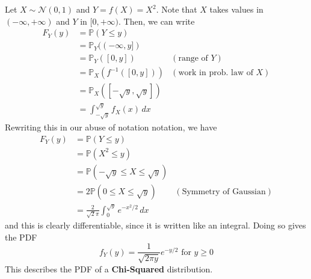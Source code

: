     \begin{example}
      Let $X \sim \mathcal{N}(0, 1)$ and $Y = f(X) = X^2$. Note that $X$ takes values in $(-\infty, +\infty)$ and $Y$ in $[0, +\infty)$. Then, we can write 
      \begin{align*}
        F_Y (y) & = \mathbb{P}(Y \leq y) \\ 
        & = \mathbb{P}_Y ( (-\infty, y]) \\
        & = \mathbb{P}_Y (  [0, y]) & (\text{range of } Y) \\
        & = \mathbb{P}_X ( f^{-1} ([0, y]) ) & (\text{work in prob. law of } X) \\
        & = \mathbb{P}_X ( [-\sqrt{y}, \sqrt{y}] ) \\
        & = \int_{-\sqrt{y}}^{\sqrt{y}} f_X (x) \,dx 
      \end{align*}
      Rewriting this in our abuse of notation notation, we have 
      \begin{align*}
        F_Y (y) & = \mathbb{P}(Y \leq y) \\
        & = \mathbb{P}(X^2 \leq y) \\
        & = \mathbb{P}( -\sqrt{y} \leq X \leq \sqrt{y}) \\
        & = 2 \mathbb{P}(0 \leq X \leq \sqrt{y}) & (\text{Symmetry of Gaussian})\\
        & = \frac{2}{\sqrt{2} \pi} \int_0^{\sqrt{y}} e^{-x^2 / 2} \,dx 
      \end{align*}
      and this is clearly differentiable, since it is written like an integral. Doing so gives the PDF
      \begin{equation}
        f_Y (y) = \frac{1}{\sqrt{2 \pi y}} e^{-y/2} \text{ for } y \geq 0
      \end{equation}
      This describes the PDF of a \textbf{Chi-Squared} distribution. 
    \end{example}

